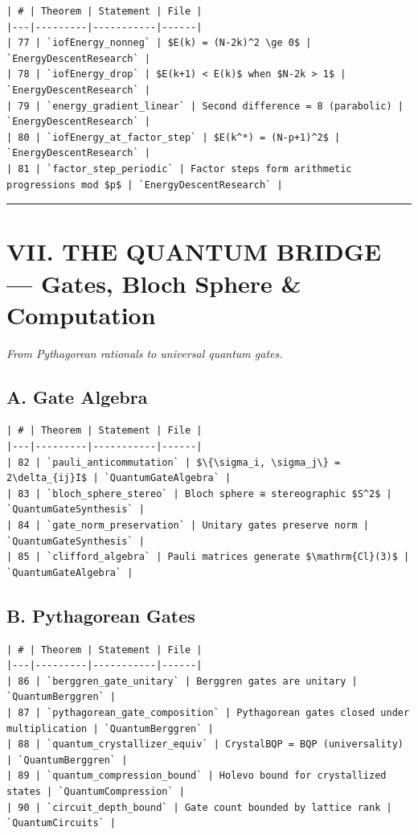 \documentclass[12pt,a4paper,openany]{book}
\begin{document}
\begin{verbatim}
| # | Theorem | Statement | File |
|---|---------|-----------|------|
| 77 | `iofEnergy_nonneg` | $E(k) = (N-2k)^2 \ge 0$ | `EnergyDescentResearch` |
| 78 | `iofEnergy_drop` | $E(k+1) < E(k)$ when $N-2k > 1$ | `EnergyDescentResearch` |
| 79 | `energy_gradient_linear` | Second difference = 8 (parabolic) | `EnergyDescentResearch` |
| 80 | `iofEnergy_at_factor_step` | $E(k^*) = (N-p+1)^2$ | `EnergyDescentResearch` |
| 81 | `factor_step_periodic` | Factor steps form arithmetic progressions mod $p$ | `EnergyDescentResearch` |
\end{verbatim}

\bigskip\hrule\bigskip

\section{VII. THE QUANTUM BRIDGE — Gates, Bloch Sphere \& Computation}

\textit{From Pythagorean rationals to universal quantum gates.}

\subsection{A. Gate Algebra}

\begin{verbatim}
| # | Theorem | Statement | File |
|---|---------|-----------|------|
| 82 | `pauli_anticommutation` | $\{\sigma_i, \sigma_j\} = 2\delta_{ij}I$ | `QuantumGateAlgebra` |
| 83 | `bloch_sphere_stereo` | Bloch sphere ≅ stereographic $S^2$ | `QuantumGateSynthesis` |
| 84 | `gate_norm_preservation` | Unitary gates preserve norm | `QuantumGateSynthesis` |
| 85 | `clifford_algebra` | Pauli matrices generate $\mathrm{Cl}(3)$ | `QuantumGateAlgebra` |
\end{verbatim}

\subsection{B. Pythagorean Gates}

\begin{verbatim}
| # | Theorem | Statement | File |
|---|---------|-----------|------|
| 86 | `berggren_gate_unitary` | Berggren gates are unitary | `QuantumBerggren` |
| 87 | `pythagorean_gate_composition` | Pythagorean gates closed under multiplication | `QuantumBerggren` |
| 88 | `quantum_crystallizer_equiv` | CrystalBQP = BQP (universality) | `QuantumBerggren` |
| 89 | `quantum_compression_bound` | Holevo bound for crystallized states | `QuantumCompression` |
| 90 | `circuit_depth_bound` | Gate count bounded by lattice rank | `QuantumCircuits` |
\end{verbatim}
\end{document}
